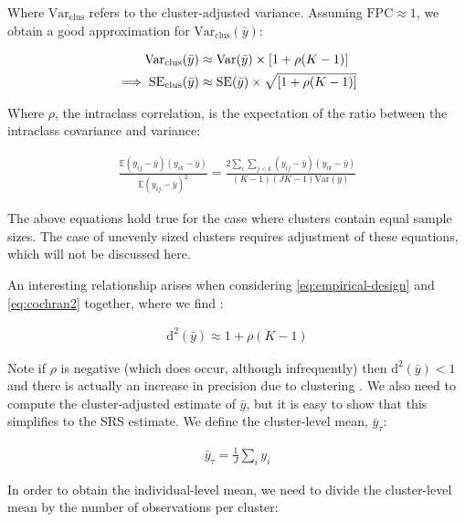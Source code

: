 Where $\text{Var}_{\text{clus}}$ refers to the cluster-adjusted variance. Assuming $\text{FPC} \approx 1$, we obtain a good approximation for $\text{Var}_{\text{clus}}(\bar{y})$:

\begin{align}
\label{eq:cochran2}
\text{Var}_{\text{clus}}(\bar{y}) 		&\approx	\text{Var}(\bar{y})  \times [1 + \rho (K - 1)]   				\\
\notag
\implies \text{SE}_{\text{clus}}(\bar{y})	&\approx	\text{SE}(\bar{y}) \times \sqrt{ [1 + \rho (K - 1)] }		
\end{align}

Where $\rho$, the intraclass correlation, is the expectation of the ratio between the intraclass covariance and variance:

\begin{align}
\label{eq:cochran3}
\frac{ \mathbb{E}(y_{ij} - \bar{y})(y_{ik} - \bar{y}) }{ \mathbb{E}(y_{ij} - \bar{y}) ^ 2 }	=	\frac{2 \sum_{i} \sum_{j<k} (y_{ij} - \bar{y})(y_{ik} - \bar{y}) }{ (K - 1) (JK - 1) \text{Var}(y) }
\end{align}

The above equations hold true for the case where clusters contain equal sample sizes. The case of unevenly sized clusters requires adjustment of these equations, which will not be discussed here.

An interesting relationship arises when considering \autoref{eq:empirical-design} and \autoref{eq:cochran2} together, where we find \citep{heeringa2017}:

\begin{align}
\label{eq:deff-rho}
\text{d}^{2}(\bar{y})		\approx	1 + \rho (K - 1)
\end{align}

Note if $\rho$ is negative (which does occur, although infrequently) then $\text{d}^{2}(\bar{y}) < 1$ and there is actually an increase in precision due to clustering \citep{cochran1977}.   We also need to compute the cluster-adjusted estimate of $\bar{y}$, but it is easy to show that this simplifies to the SRS estimate. We define the cluster-level mean, $\bar{y}_{\tau}$:

\begin{align}
\label{eq:clust-mean}
\bar{y}_{\tau}	=	\frac{1}{J} \sum_{i} y_{i}
\end{align}

In order to obtain the individual-level mean, we need to divide the cluster-level mean by the number of observations per cluster:

